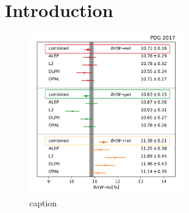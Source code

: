 \chapter{Introduction}
\label{sec:introduction}



\begin{figure}[ht]
    \centering
    \includegraphics[width=0.6\textwidth]{chapters/Introduction/figures/wdecay.png}
    \caption{caption}
    \label{fig:introduction:wbr}
\end{figure}
